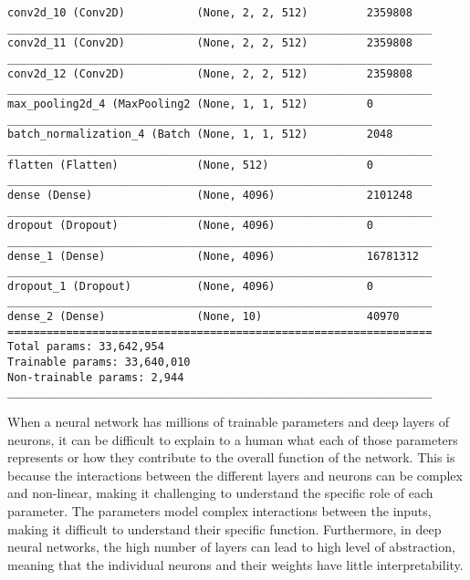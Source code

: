 \begin{lstlisting}[style=kaolstplain,linewidth=1.5\textwidth]
conv2d_10 (Conv2D)           (None, 2, 2, 512)         2359808   
_________________________________________________________________
conv2d_11 (Conv2D)           (None, 2, 2, 512)         2359808   
_________________________________________________________________
conv2d_12 (Conv2D)           (None, 2, 2, 512)         2359808   
_________________________________________________________________
max_pooling2d_4 (MaxPooling2 (None, 1, 1, 512)         0         
_________________________________________________________________
batch_normalization_4 (Batch (None, 1, 1, 512)         2048      
_________________________________________________________________
flatten (Flatten)            (None, 512)               0         
_________________________________________________________________
dense (Dense)                (None, 4096)              2101248   
_________________________________________________________________
dropout (Dropout)            (None, 4096)              0         
_________________________________________________________________
dense_1 (Dense)              (None, 4096)              16781312  
_________________________________________________________________
dropout_1 (Dropout)          (None, 4096)              0         
_________________________________________________________________
dense_2 (Dense)              (None, 10)                40970     
=================================================================
Total params: 33,642,954
Trainable params: 33,640,010
Non-trainable params: 2,944
_________________________________________________________________
\end{lstlisting}

When a neural network has millions of trainable parameters and deep layers of neurons, it can be difficult to explain to a human what each of those parameters represents or how they contribute to the overall function of the network. This is because the interactions between the different layers and neurons can be complex and non-linear, making it challenging to understand the specific role of each parameter. The parameters  model complex interactions between the inputs, making it difficult to understand their specific function. Furthermore, in deep neural networks, the high number of layers can lead to high level of abstraction, meaning that the individual neurons and their weights have little interpretability.

